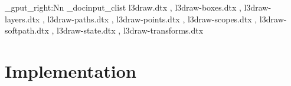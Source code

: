 \documentclass{l3doc}
\begin{document}
\makeatletter
\let\DelayPrintIndex\PrintIndex
\let\PrintIndex\@empty
\makeatother

\ExplSyntaxOn
\clist_gput_right:Nn \g_docinput_clist
  {
    l3draw.dtx            ,
    l3draw-boxes.dtx      ,
    l3draw-layers.dtx     ,
    l3draw-paths.dtx      ,
    l3draw-points.dtx     ,
    l3draw-scopes.dtx     ,
    l3draw-softpath.dtx   ,
    l3draw-state.dtx      ,
    l3draw-transforms.dtx
  }
\ExplSyntaxOff

\part{Implementation}

\def\maketitle{}
\EnableImplementation
\DisableDocumentation
\DocInputAgain

\clearpage

\DelayPrintIndex
\end{document}

